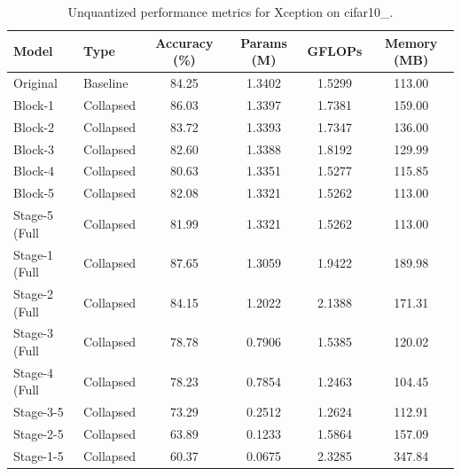 \begin{table}
\caption{Unquantized performance metrics for Xception on cifar10_.}
\label{tab:Xception_cifar10__unquant}
\begin{tabular}{llcccc}
\toprule
Model & Type & Accuracy (\%) & Params (M) & GFLOPs & Memory (MB) \\
\midrule
Original & Baseline & 84.25 & 1.3402 & 1.5299 & 113.00 \\
Block-1 & Collapsed & 86.03 & 1.3397 & 1.7381 & 159.00 \\
Block-2 & Collapsed & 83.72 & 1.3393 & 1.7347 & 136.00 \\
Block-3 & Collapsed & 82.60 & 1.3388 & 1.8192 & 129.99 \\
Block-4 & Collapsed & 80.63 & 1.3351 & 1.5277 & 115.85 \\
Block-5 & Collapsed & 82.08 & 1.3321 & 1.5262 & 113.00 \\
Stage-5 (Full & Collapsed & 81.99 & 1.3321 & 1.5262 & 113.00 \\
Stage-1 (Full & Collapsed & 87.65 & 1.3059 & 1.9422 & 189.98 \\
Stage-2 (Full & Collapsed & 84.15 & 1.2022 & 2.1388 & 171.31 \\
Stage-3 (Full & Collapsed & 78.78 & 0.7906 & 1.5385 & 120.02 \\
Stage-4 (Full & Collapsed & 78.23 & 0.7854 & 1.2463 & 104.45 \\
Stage-3-5 & Collapsed & 73.29 & 0.2512 & 1.2624 & 112.91 \\
Stage-2-5 & Collapsed & 63.89 & 0.1233 & 1.5864 & 157.09 \\
Stage-1-5 & Collapsed & 60.37 & 0.0675 & 2.3285 & 347.84 \\
\bottomrule
\end{tabular}
\end{table}

